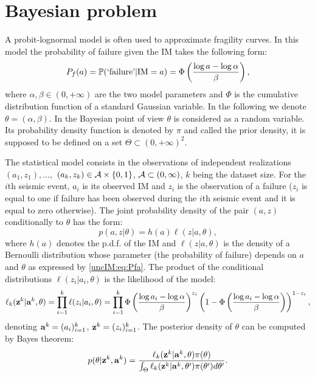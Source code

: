    
\section{Bayesian problem} \label{uncIM:sec:pb}

    A probit-lognormal model is often used to approximate fragility curves.
    In this model the probability of failure given the IM takes the following form:
        \begin{equation} \label{uncIM:eq:Pfa}
            P_f(a)=\mathbb{P}(\mbox{`failure'}|\text{IM}=a) = \Phi\left(\frac{\log a-\log\alpha}{\beta}\right) ,
        \end{equation}
    where $\alpha, \beta\in (0,+\infty)$ are the two model parameters and $\Phi$ is the cumulative distribution function of a standard Gaussian variable. In the following we denote $\theta=(\alpha,\beta)$. 
    In the Bayesian point of view  $\theta$ is considered as a random variable. Its probability density function is denoted by $\pi$ and called the prior density, it is supposed to be defined on a set $\Theta\subset (0,+\infty)^2$.
    
    The statistical model consists in the observations of independent realizations $(a_1,z_1),\dots,$ $(a_k,z_k)\in\mathcal{A}\times \{0,1\}$, $\mathcal{A} \subset (0,\infty)$, $k$ being the dataset size. For the $i$th seismic event, $a_i$ is its observed IM and $z_i$ is the observation of a failure ($z_i$ is equal to one if failure has been observed during the $i$th seismic event and it is equal to zero otherwise). %
    The joint probability density of the pair $(a,z)$ conditionally to $\theta$ has the form:
        \begin{equation}
            p(a,z|\theta) %
            = h(a)\ell(z|a,\theta) ,
        \end{equation}
    where $h(a)$ denotes the p.d.f. of the IM and $\ell(z|a,\theta)$ is the density of a Bernoulli distribution whose parameter (the probability of failure) depends on $a$ and $\theta$ as expressed by \cref{uncIM:eq:Pfa}.
    The product of the conditional distributions $\ell(z_i|a_i,\theta)$ is the likelihood of the model:
        \begin{equation} \label{uncIM:eq:likelihood}
            \ell_k(\mathbf{z}^k|\mathbf{a}^k,\theta) = \prod_{i=1}^k \ell(z_i|a_i,\theta)= \prod_{i=1}^k \Phi\left(\frac{\log{a_i}-\log{\alpha}}{\beta}\right)^{z_i}\left(1-\Phi\left(\frac{\log{a_i}-\log{\alpha}}{\beta}\right)\right)^{1-z_i}  ,
        \end{equation}
    denoting $\mathbf{a}^k=(a_i)_{i=1}^k$, $\mathbf{z}^k=(z_i)_{i=1}^k$. The posterior density of $\theta$  can be computed by Bayes theorem: %
        \begin{equation} \label{uncIM:eq:posterior}
            p(\theta|\mathbf{z}^k,\mathbf{a}^k)=\frac{\ell_k(\mathbf{z}^k|\mathbf{a}^k,\theta)\pi(\theta)}{\int_\Theta \ell_k(\mathbf{z}^k|\mathbf{a}^k,\theta')\pi(\theta') d\theta'}.
        \end{equation}

